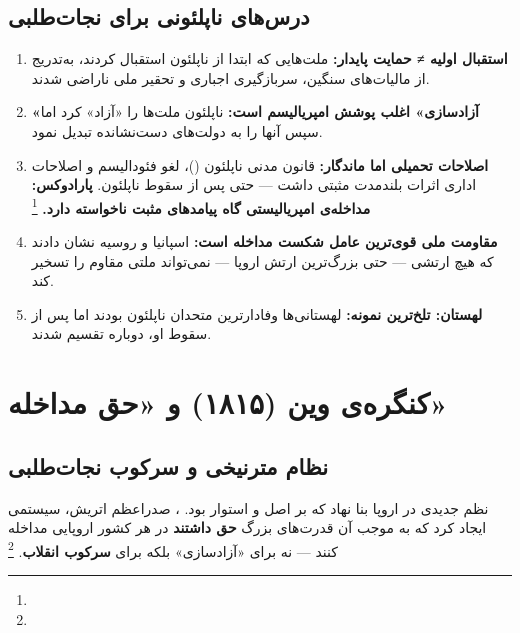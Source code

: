 \subsection{درس‌های ناپلئونی برای نجات‌طلبی}

\begin{tcolorbox}[defbox, title={درس‌های کلیدی از تجربه‌ی ناپلئونی}]
\begin{enumerate}[nosep, label=\textbf{\arabic*.}]
  \item \textbf{استقبال اولیه ≠ حمایت پایدار:} ملت‌هایی که ابتدا از ناپلئون استقبال کردند، به‌تدریج از مالیات‌های سنگین، سربازگیری اجباری و تحقیر ملی ناراضی شدند.

  \item \textbf{«آزادسازی» اغلب پوشش امپریالیسم است:} ناپلئون ملت‌ها را «آزاد» کرد اما سپس آنها را به دولت‌های دست‌نشانده تبدیل نمود.

  \item \textbf{اصلاحات تحمیلی اما ماندگار:} قانون مدنی ناپلئون ()، لغو فئودالیسم و اصلاحات اداری اثرات بلندمدت مثبتی داشت — حتی پس از سقوط ناپلئون. \textbf{پارادوکس: مداخله‌ی امپریالیستی گاه پیامدهای مثبت ناخواسته دارد.}%
  \footnote{}

  \item \textbf{مقاومت ملی قوی‌ترین عامل شکست مداخله است:} اسپانیا و روسیه نشان دادند که هیچ ارتشی — حتی بزرگ‌ترین ارتش اروپا — نمی‌تواند ملتی مقاوم را تسخیر کند.

  \item \textbf{لهستان: تلخ‌ترین نمونه:} لهستانی‌ها وفادارترین متحدان ناپلئون بودند اما پس از سقوط او، دوباره تقسیم شدند. 
\end{enumerate}
\end{tcolorbox}

\section{کنگره‌ی وین (۱۸۱۵) و «حق مداخله»}
\label{sec:ch08-vienna}

\subsection{نظام مترنیخی و سرکوب نجات‌طلبی}

 نظم جدیدی در اروپا بنا نهاد که بر اصل  و  استوار بود. ، صدراعظم اتریش، سیستمی ایجاد کرد که به موجب آن قدرت‌های بزرگ \textbf{حق داشتند} در هر کشور اروپایی مداخله کنند — نه برای «آزادسازی» بلکه برای \textbf{سرکوب انقلاب}.%
\footnote{}

